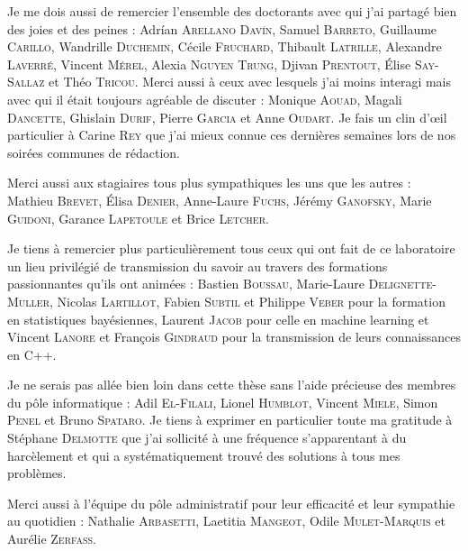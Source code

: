 Je me dois aussi de remercier l'ensemble des doctorants avec qui j'ai partagé bien des joies et des peines : 
Adr\'ian \textsc{Arellano Dav\'in}, 
Samuel \textsc{Barreto},
Guillaume \textsc{Carillo},
Wandrille \textsc{Duchemin},
Cécile \textsc{Fruchard},
Thibault \textsc{Latrille},
Alexandre \textsc{Laverré},
Vincent \textsc{Mérel},
Alexia \textsc{Nguyen Trung},
Djivan \textsc{Prentout},
\'Elise \textsc{Say-Sallaz} et
Théo \textsc{Tricou}.
Merci aussi à ceux avec lesquels j'ai moins interagi mais avec qui il était toujours agréable de discuter : 
Monique \textsc{Aouad},
Magali \textsc{Dancette},
Ghislain \textsc{Durif},
Pierre \textsc{Garcia} et Anne \textsc{Oudart}.
Je fais un clin d'œil particulier à Carine \textsc{Rey} que j'ai mieux connue ces dernières semaines lors de nos soirées communes de rédaction.

Merci aussi aux stagiaires tous plus sympathiques les uns que les autres : Mathieu \textsc{Brevet}, \'Elisa \textsc{Denier}, Anne-Laure \textsc{Fuchs}, Jérémy \textsc{Ganofsky}, Marie \textsc{Guidoni}, Garance \textsc{Lapetoule} et Brice \textsc{Letcher}.


Je tiens à remercier plus particulièrement tous ceux qui ont fait de ce laboratoire un lieu privilégié de transmission du savoir au travers des formations passionnantes qu'ils ont animées : 
Bastien \textsc{Boussau}, Marie-Laure \textsc{Delignette-Muller}, Nicolas \textsc{Lartillot}, Fabien \textsc{Subtil} et Philippe \textsc{Veber} pour la formation en statistiques bayésiennes, Laurent \textsc{Jacob} pour celle en machine learning et Vincent \textsc{Lanore} et François \textsc{Gindraud} pour la transmission de leurs connaissances en C++.



Je ne serais pas allée bien loin dans cette thèse sans l'aide précieuse des membres du pôle informatique : 
Adil \textsc{El-Filali},
Lionel \textsc{Humblot},
Vincent \textsc{Miele},
Simon \textsc{Penel} et
Bruno \textsc{Spataro}.
Je tiens à exprimer en particulier toute ma gratitude à Stéphane \textsc{Delmotte} que j'ai sollicité à une fréquence s'apparentant à du harcèlement et qui a systématiquement trouvé des solutions à tous mes problèmes.

Merci aussi à l'équipe du pôle administratif pour leur efficacité et leur sympathie au quotidien : 
Nathalie \textsc{Arbasetti},
Laetitia \textsc{Mangeot},
Odile \textsc{Mulet-Marquis} et
Aurélie \textsc{Zerfass}.

